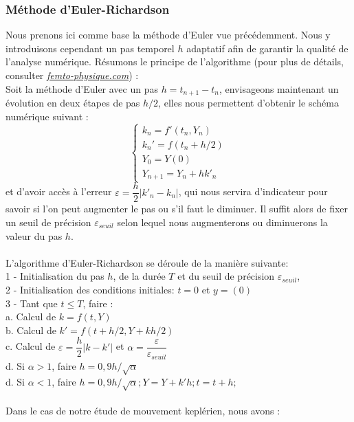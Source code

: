 \documentclass[11pt]{article} %
\newcommand \tab[1][1cm]{\hspace*{#1}}
\begin{document}
\subsubsection{Méthode d'Euler-Richardson}
Nous prenons ici comme base la méthode d'Euler vue précédemment. Nous y introduisons cependant un pas temporel $h$ adaptatif afin de garantir la qualité de l'analyse numérique. Résumons le principe de l'algorithme (pour plus de détails, consulter \href{https://femto-physique.fr/omp/euler-richardson.php}{\textit{femto-physique.com}}) : \\
Soit la méthode d'Euler avec un pas $h=t_{n+1}-t_n$, envisageons maintenant un évolution en deux étapes de pas $h/2$, elles nous permettent d'obtenir le schéma numérique suivant : 
\begin{equation}
\begin{cases}k_n=f'(t_n,Y_n) \\k_n'=f(t_n+h/2) \\ Y_0 = Y(0) \\ Y_{n+1} = Y_n + hk'_n \end{cases}
\end{equation}
et d'avoir accès à l'erreur $\varepsilon = \dfrac{h}{2}|k'_n-k_n|$, qui nous servira d'indicateur pour savoir si l'on peut augmenter le pas ou s'il faut le diminuer. Il suffit alors de fixer un seuil de précision $\varepsilon_{seuil}$ selon lequel nous augmenterons ou diminuerons la valeur du pas $h$.\\\\
L'algorithme d'Euler-Richardson se déroule de la manière suivante:\\
1 - Initialisation du pas $h$, de la durée $T$ et du seuil de précision $\varepsilon_{seuil}$,\\
2 - Initialisation des conditions initiales: $t=0$ et $y=(0)$\\
3 - Tant que $t \leq T$, faire :\\
\tab a. Calcul de $k=f(t,Y)$\\
\tab b. Calcul de $k'=f(t+h/2,Y+kh/2)$\\
\tab c. Calcul de $\varepsilon = \dfrac{h}{2}|k-k'|$ et $\alpha = \dfrac{\varepsilon}{\varepsilon_{seuil}}$\\
\tab d. Si $\alpha>1$, faire $h=0,9h/\sqrt{\alpha}$\\
\tab d. Si $\alpha<1$, faire $h=0,9h/\sqrt{\alpha}; Y =Y+k'h; t=t+h;$\\\\

Dans le cas de notre étude de mouvement keplérien, nous avons : 
\end{document}
